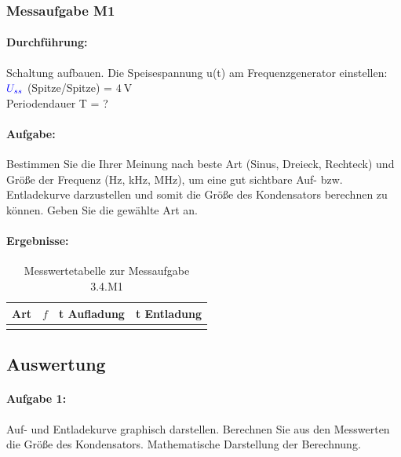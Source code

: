 \documentclass[11pt,a4paper,titlepage,parskip=half]{scrreprt}
\begin{document}
                \subsubsection{Messaufgabe M1}
                    \paragraph{Durchführung:}Schaltung aufbauen. Die Speisespannung u(t) am Frequenzgenerator einstellen:\\
					$\textcolor{blue}{U_{ss}}$ (Spitze/Spitze) = $\SI{4}{\volt}$\\
					Periodendauer T = ?
                    \paragraph{Aufgabe:}Bestimmen Sie die Ihrer Meinung nach beste Art (Sinus, Dreieck, Rechteck) und Größe der Frequenz (Hz, kHz, MHz), um eine gut sichtbare Auf- bzw. Entladekurve
darzustellen und somit die Größe des Kondensators berechnen zu können. Geben Sie
die gewählte Art an.

            		\paragraph{Ergebnisse:}
            		\begin{center}
                       \begin{table}[H]
                           \caption{Messwertetabelle zur Messaufgabe 3.4.M1}
                           \label{tbl:messergebnisse3.4}
                           \renewcommand{\arraystretch}{1.6}
                           \begin{center}
                               \begin{tabular}{c|c|c|c}
									Art & $f$ & t Aufladung & t Entladung\\ \hline
									\qquad\qquad\qquad & \qquad\qquad\qquad & \qquad\qquad\qquad & \qquad\qquad\qquad
							   \end{tabular}
                           \end{center}
                       \end{table}
                   \end{center}
            \subsection{Auswertung}
                \paragraph{Aufgabe 1:}Auf- und Entladekurve graphisch darstellen. Berechnen Sie aus den Messwerten die Größe des Kondensators. Mathematische Darstellung der Berechnung.
                	  
\end{document}

